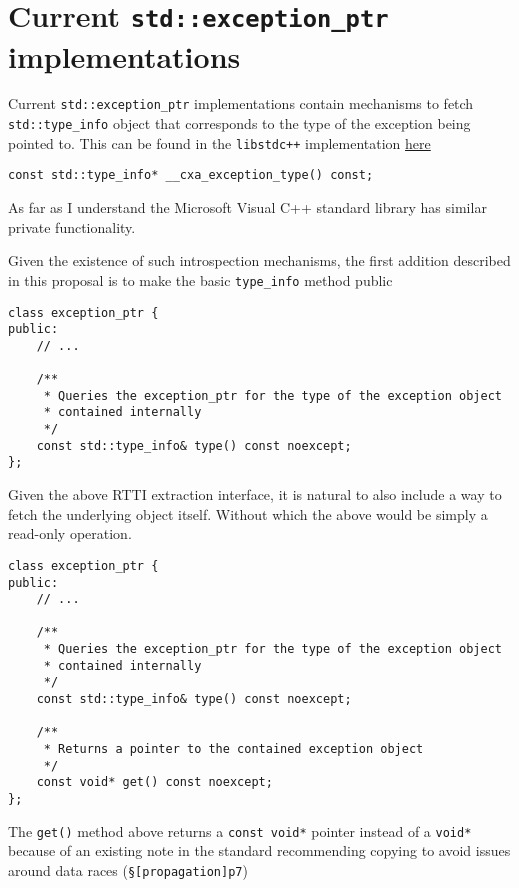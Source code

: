 \documentclass{article}
\begin{document}
\section{Current \texttt{std::exception\_ptr} implementations}
Current \texttt{std::exception\_ptr} implementations contain mechanisms to
fetch \texttt{std::type\_info} object that corresponds to the type of the
exception being pointed to.  This can be found in the \texttt{libstdc++}
implementation \href{https://goo.gl/u4oYcv}{here}
\begin{lstlisting}
const std::type_info* __cxa_exception_type() const;
\end{lstlisting}

As far as I understand the Microsoft Visual C++ standard library has similar
private functionality.

Given the existence of such introspection mechanisms, the first addition
described in this proposal is to make the basic \texttt{type\_info} method
public

\begin{lstlisting}
class exception_ptr {
public:
    // ...

    /**
     * Queries the exception_ptr for the type of the exception object
     * contained internally
     */
    const std::type_info& type() const noexcept;
};
\end{lstlisting}

Given the above RTTI extraction interface, it is natural to also include a way
to fetch the underlying object itself.  Without which the above would be
simply a read-only operation.

\begin{lstlisting}
class exception_ptr {
public:
    // ...

    /**
     * Queries the exception_ptr for the type of the exception object
     * contained internally
     */
    const std::type_info& type() const noexcept;

    /**
     * Returns a pointer to the contained exception object
     */
    const void* get() const noexcept;
};
\end{lstlisting}

The \texttt{get()} method above returns a \texttt{const void*} pointer instead
of a \texttt{void*} because of an existing note in the standard recommending
copying to avoid issues around data races (\texttt{§[propagation]p7})

\begin{displayquote}
\end{displayquote}
\end{document}
